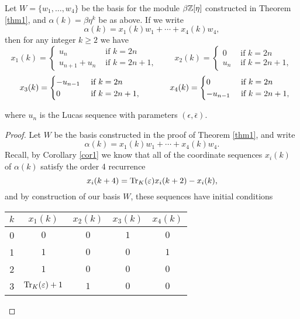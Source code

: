 \documentclass[11pt]{amsart}
\begin{document}
\begin{cor} Let $W=\{w_1, \dots, w_4\}$ be the basis for the module $\beta \mathbb{Z}[\eta]$ constructed in Theorem \ref{thm1}, and $\alpha(k)=\beta \eta^k$ be as above. If we write
\[\alpha(k)=x_1(k)w_1+\cdots+x_4(k)w_4,\]
then for any integer $k \geq 2$ we have\\
\[x_1(k) =\begin{cases} u_n & \text{ if } k=2n \\ u_{n+1}+u_n & \text{ if } k=2n+1, \end{cases}
\hspace{2em} x_2(k)=\begin{cases} 0 & \text{ if } k =2n \\ u_n & \text{ if } k=2n+1,\end{cases}\]
\vspace{0.2em}
\[\hspace{0.75em} x_3(k)=\begin{cases} - u_{n-1}  & \text{ if } k=2n \\ 0 & \text{ if } k=2n+1,\end{cases} 
\hspace{3.5em} x_4(k)=\begin{cases} 0 & \text{ if } k=2n \\ - u_{n-1} & \text{ if } k=2n+1, \end{cases}\]
\vspace{0.25em}

where $u_n$ is the Lucas sequence with parameters $(\epsilon, \bar{\epsilon})$. 

\begin{proof} Let $W$ be the basis constructed in the proof of Theorem \ref{thm1}, and write
\[\alpha(k)=x_1(k)w_1+\cdots+x_4(k)w_4.\]
Recall, by Corollary \ref{cor1} we know that all of the coordinate sequences $x_i(k)$ of $\alpha(k)$ satisfy the order 4 recurrence
\[x_i(k+4)=\operatorname{Tr}_K(\varepsilon) x_i(k+2)-x_i(k),\]
and by construction of our basis $W$, these sequences have initial conditions
\begin{center}
\begin{tabular}{c | c c c c}
$k$ 	& $x_1(k)$ 				& $x_2(k)$ 	& $x_3(k)$ 		& $x_4(k)$ 		\\\hline
0	& $0$					& $0$		& $1$			& $0$ 			\\
1	& $1$					& $0$		& $0$			& $1$ 			\\
2	& $1$					& $0$		& $0$			& $0$ 			\\
3	& $\operatorname{Tr}_K(\varepsilon)+1$		& $1$		& $0$			& $0$
\end{tabular}
\end{center}


\end{proof}
\end{cor}
\end{document}
